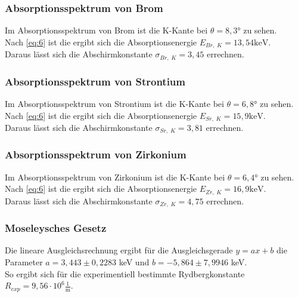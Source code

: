 \documentclass[a4paper]{scrartcl}
\begin{document}
\subsubsection*{Absorptionsspektrum von Brom}
Im Absorptionsspektrum von Brom ist die K-Kante bei $\theta = 8,3°$ zu sehen. \\
Nach \autoref{eq:6} ist die ergibt sich die Absorptionsenergie $E_{Br, \; K} = 13,54 \mathrm{ keV}$.\\
Daraus lässt sich die Abschirmkonstante $\sigma_{Br, \; K} = 3,45$ errechnen.

\subsubsection*{Absorptionsspektrum von Strontium}
Im Absorptionsspektrum von Strontium ist die K-Kante bei $\theta = 6,8°$ zu sehen. \\
Nach \autoref{eq:6} ist die ergibt sich die Absorptionsenergie $E_{Sr,\; K} = 15,9  \mathrm{ keV}$.\\
Daraus lässt sich die Abschirmkonstante $\sigma_{Sr, \; K} = 3,81$ errechnen.

\subsubsection*{Absorptionsspektrum von Zirkonium}
Im Absorptionsspektrum von Zirkonium ist die K-Kante bei $\theta = 6,4°$ zu sehen. \\
Nach \autoref{eq:6} ist die ergibt sich die Absorptionsenergie $E_{Zr, \; K} = 16,9  \mathrm{ keV}$.\\
Daraus lässt sich die Abschirmkonstante $\sigma_{Zr, \; K} = 4,75$ errechnen.





\subsubsection*{Moseleysches Gesetz}

Die lineare Ausgleichsrechnung ergibt für die Ausgleichsgerade $y = ax + b$ die Parameter $a = 3,443 \pm 0,2283$ keV und $b = -5,864 \pm 7,9946$ keV.\\
So ergibt sich für die experimentiell bestimmte Rydbergkonstante $R_{exp} = 9,56 \cdot 10^6 \mathrm{\frac{1}{m}}$. 
\end{document}
